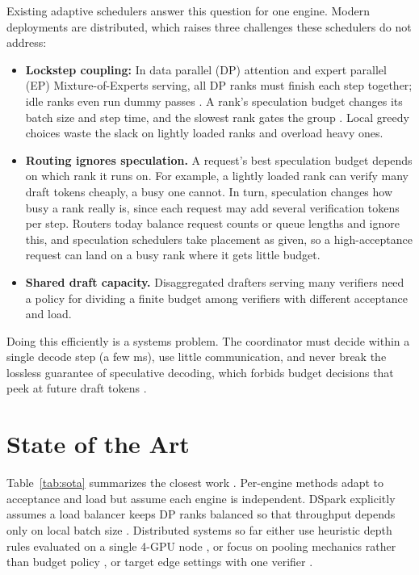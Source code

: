 \documentclass{article}
\begin{document}
Existing adaptive schedulers answer this question for one engine. Modern
deployments are distributed, which raises three challenges these schedulers do not address:

\begin{itemize}
\item \textbf{Lockstep coupling:} In data parallel (DP) attention and expert parallel (EP) Mixture-of-Experts
serving, all DP ranks must finish each step together; idle ranks even run dummy
passes \cite{anyscale2026ep}. A rank's speculation budget changes its batch size
and step time, and the slowest rank gates the group \cite{nanocp2026}. Local
greedy choices waste the slack on lightly loaded ranks and overload heavy ones.
\item \textbf{Routing ignores speculation.} A request's best speculation
budget depends on which rank it runs on. For example, a lightly loaded rank can verify many
draft tokens cheaply, a busy one cannot. In turn, speculation changes how busy
a rank really is, since each request may add several verification tokens per
step. Routers today balance request counts or queue lengths and ignore this,
and speculation schedulers take placement as given, so a high-acceptance request can land on a busy rank where it gets little budget.
\item \textbf{Shared draft capacity.} Disaggregated drafters serving many
verifiers \cite{vllm2026disagg,he2026nebulasd} need a policy for dividing a
finite budget among verifiers with different acceptance and load.
\end{itemize}

Doing this efficiently is a systems problem. The coordinator must decide
within a single decode step (a few ms), use little communication, and never break the
lossless guarantee of speculative decoding, which forbids budget decisions that peek at future draft
tokens \cite{cheng2026dspark}.

\section{State of the Art}
\label{sec:sota}

Table~\ref{tab:sota} summarizes the closest work
\cite{liu2024smartspec,li2025adaserve,huang2025adaspec,wu2025tetris,chen2026faser,tran2026goodspeed}.
Per-engine methods adapt to
acceptance and load but assume each engine is independent. DSpark explicitly
assumes a load balancer keeps DP ranks balanced so that throughput depends only on
local batch size \cite{cheng2026dspark}. Distributed systems so far either use
heuristic depth rules evaluated on a single 4-GPU node \cite{kumar2026streamserve},
or focus on pooling mechanics rather than budget policy \cite{he2026nebulasd}, or
target edge settings with one verifier \cite{tran2026goodspeed}.
\end{document}
